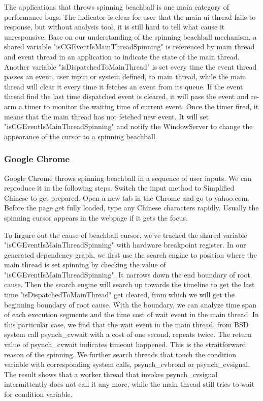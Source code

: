 The applications that throws spinning beachball is one main category of performance bugs.
The indicator is clear for user that the main ui thread fails to response, but without analysis tool, it is still hard to tell what cause it unresponsive. 
Base on our understanding of the spinning beachball mechanism, a shared variable "isCGEventIsMainThreadSpinning" is referenced by main thread and event thread in an application to indicate the state of the main thread.
Another variable "isDispatchedToMainThread" is set every time the event thread passes an event, user input or system defined, to main thread,
while the main thread will clear it every time it fetches an event from its queue.
If the event thread find the last time dispatched event is cleared, it will pass the event and re-arm a timer to monitor the waiting time of current event.
Once the timer fired, it means that the main thread has not fetched new event.
It will set "isCGEventIsMainThreadSpinning" and notify the WindowServer to change the appearance of the cursor to a spinning beachball.
\subsubsection{Google Chrome}
Google Chrome throws spinning beachball in a sequence of user inputs.
We can reproduce it in the following steps.
Switch the input method to Simplified Chinese to get prepared.
Open a new tab in the Chrome and go to yahoo.com.
Before the page get fully loaded, type any Chinese characters rapidly.
Usually the spinning cursor appears in the webpage if it gets the focus.
\par
To firgure out the cause of beachball cursor, we've tracked the shared variable "isCGEventIsMainThreadSpinning" with hardware breakpoint register.
In our generated dependency graph, we first use the search engine to position where the main thread is set spinning by checking the value of "isCGEventIsMainThreadSpinning".
It narrows down the end boundary of root cause.
Then the search engine will search up towards the timeline to get the last time "isDispatchedToMainThread" get cleared, from which we will get the beginning boundary of root cause.
With the boundary, we can analyze time span of each execution segments and the time cost of wait event in the main thread.
In this particular case, we find that the wait event in the main thread, from BSD system call psynch\_cvwait with a cost of one second, repeats twice.
The return value of psynch\_cvwait indicates timeout happened.
This is the straitforward reason of the spinning.
We further search threads that touch the condition variable with corresponding system calls, psynch\_cvbroad or psynch\_cvsignal.
The result shows that a worker thread that invokes psynch\_cvsignal intermittently does not call it any more, while the main thread still tries to wait for condition variable.
